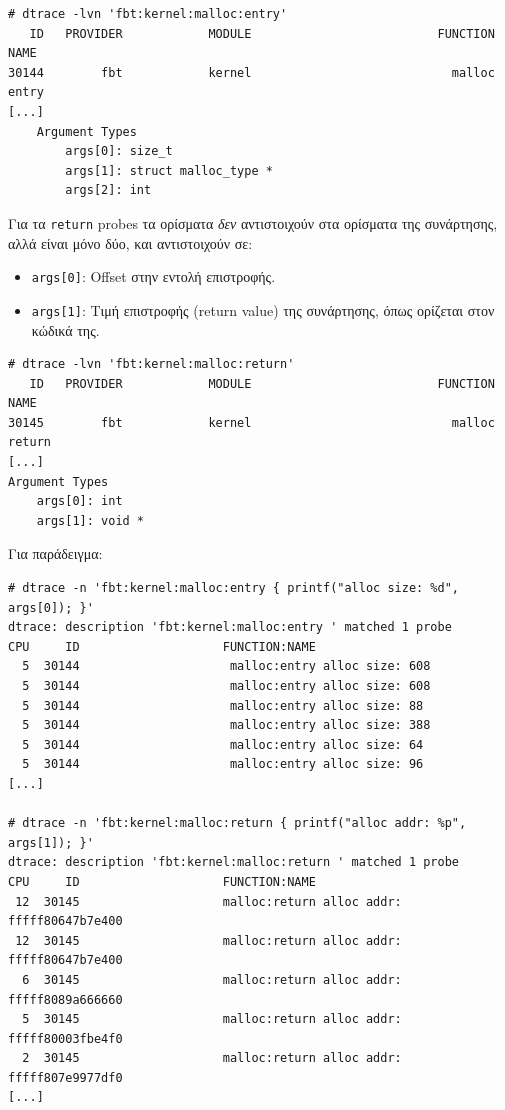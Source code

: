 \documentclass[12pt]{article}
\begin{document}
\begin{lstlisting}
# dtrace -lvn 'fbt:kernel:malloc:entry'
   ID   PROVIDER            MODULE                          FUNCTION NAME
30144        fbt            kernel                            malloc entry
[...]
	Argument Types
		args[0]: size_t
		args[1]: struct malloc_type *
		args[2]: int
\end{lstlisting}

Για τα \lstinline{return} probes τα ορίσματα \textit{δεν} αντιστοιχούν στα
ορίσματα της συνάρτησης, αλλά είναι μόνο δύο, και αντιστοιχούν σε:

\begin{itemize}
	\item \lstinline{args[0]}: Offset στην εντολή επιστροφής.
	\item \lstinline{args[1]}: Τιμή επιστροφής (return value) της
		συνάρτησης, όπως ορίζεται στον κώδικά της.
\end{itemize}

\begin{lstlisting}
# dtrace -lvn 'fbt:kernel:malloc:return'
   ID   PROVIDER            MODULE                          FUNCTION NAME
30145        fbt            kernel                            malloc return
[...]
Argument Types
	args[0]: int
	args[1]: void *
\end{lstlisting}

Για παράδειγμα:

\begin{lstlisting}
# dtrace -n 'fbt:kernel:malloc:entry { printf("alloc size: %d", args[0]); }'
dtrace: description 'fbt:kernel:malloc:entry ' matched 1 probe
CPU     ID                    FUNCTION:NAME
  5  30144                     malloc:entry alloc size: 608
  5  30144                     malloc:entry alloc size: 608
  5  30144                     malloc:entry alloc size: 88
  5  30144                     malloc:entry alloc size: 388
  5  30144                     malloc:entry alloc size: 64
  5  30144                     malloc:entry alloc size: 96
[...]

# dtrace -n 'fbt:kernel:malloc:return { printf("alloc addr: %p", args[1]); }'
dtrace: description 'fbt:kernel:malloc:return ' matched 1 probe
CPU     ID                    FUNCTION:NAME
 12  30145                    malloc:return alloc addr: fffff80647b7e400
 12  30145                    malloc:return alloc addr: fffff80647b7e400
  6  30145                    malloc:return alloc addr: fffff8089a666660
  5  30145                    malloc:return alloc addr: fffff80003fbe4f0
  2  30145                    malloc:return alloc addr: fffff807e9977df0
[...]
\end{lstlisting}
\end{document}
